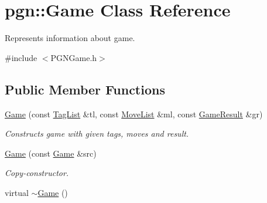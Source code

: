 \hypertarget{classpgn_1_1Game}{
\section{pgn::Game Class Reference}
\label{classpgn_1_1Game}
}


Represents information about game.  




{\ttfamily \#include $<$PGNGame.h$>$}

\subsection*{Public Member Functions}
\begin{DoxyCompactItemize}
\item 
\hyperlink{classpgn_1_1Game_af70cf1dfd509c2e8ec14905222ad02c4}{Game} (const \hyperlink{classpgn_1_1TagList}{TagList} \&tl, const \hyperlink{classpgn_1_1MoveList}{MoveList} \&ml, const \hyperlink{classpgn_1_1GameResult}{GameResult} \&gr)
\begin{DoxyCompactList}\small\item\em Constructs game with given tags, moves and result. \item\end{DoxyCompactList}\item 
\hyperlink{classpgn_1_1Game_ac7301876d9b4e3b49af18b0fcdd67e96}{Game} (const \hyperlink{classpgn_1_1Game}{Game} \&src)
\begin{DoxyCompactList}\small\item\em Copy-\/constructor. \item\end{DoxyCompactList}\item 
\hypertarget{classpgn_1_1Game_a06895c2c9d8aceb6112dbaf08e9d52c5}{
virtual \hyperlink{classpgn_1_1Game_a06895c2c9d8aceb6112dbaf08e9d52c5}{$\sim$Game} ()}
\label{classpgn_1_1Game_a06895c2c9d8aceb6112dbaf08e9d52c5}


\end{DoxyCompactItemize}
